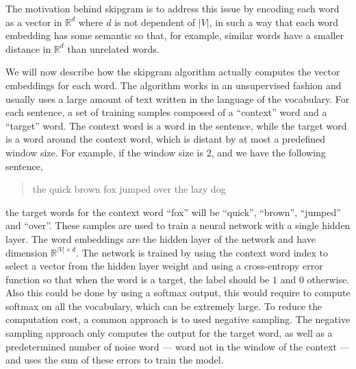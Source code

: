 The motivation behind skipgram is to address this issue by encoding each word
as a vector in $\mathbb{R}^d$ where $d$ is not dependent of $|V|$, in such a way
that each word embedding has some semantic so that, for example, similar words
have a smaller distance in $\mathbb{R}^d$ than unrelated words.

We will now describe how the skipgram algorithm actually computes the vector
embeddings for each word. The algorithm works in an unsupervised fashion and
usually uses a large amount of text written in the language of the vocabulary.
For each sentence, a set of training samples composed of a ``context'' word and
a ``target'' word. The context word is a word in the sentence, while the target
word is a word around the context word, which is distant by at most a predefined
window size. For example, if the window size is 2, and we have the following
sentence,
\begin{quotation}
the quick brown fox jumped over the lazy dog
\end{quotation}
the target words for the context word ``fox'' will be ``quick'', ``brown'',
``jumped'' and ``over''. These samples are used to train a neural network with a
single hidden layer. The word embeddings are the hidden layer of the network and
have dimension $\mathbb{R}^{|V|\times d}$. The network is trained by using the context
word index to select a vector from the hidden layer weight and using a
cross-entropy error function so that when the word is a target, the label should
be $1$ and $0$ otherwise. Also this could be done by using a softmax output,
this would require to compute softmax on all the vocabulary, which can be
extremely large. To reduce the computation cost, a common approach is to used
negative sampling. The negative sampling approach only computes the output for
the target word, as well as a predetermined number of noise word --- word
not in the window of the context --- and uses the sum of these errors to train
the model.
